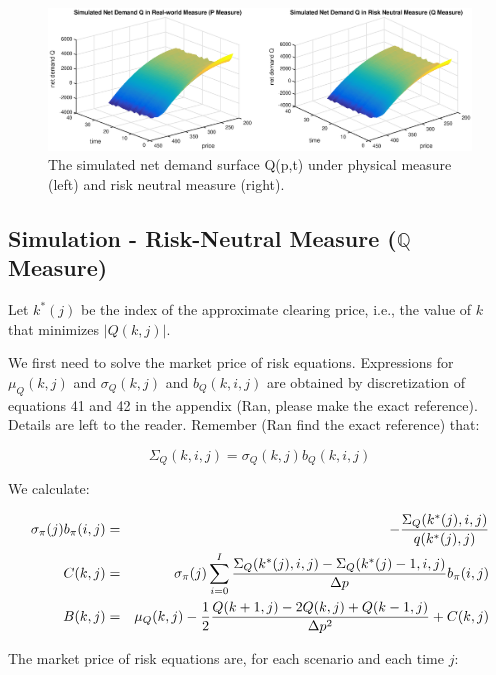 \documentclass{article}
\begin{document}
\begin{center}
\begin{figure}[tbp]
\centering
\includegraphics[scale = 0.5]{Q_both_measures.eps}\newline
\caption{The simulated net demand surface Q(p,t) under physical measure
(left) and risk neutral measure (right).}
\label{fig::AAPL_20110401_simulated_both_measures}
\end{figure}
\end{center}

\subsection{Simulation - Risk-Neutral Measure ($\mathbb{Q}$ Measure)}

Let $k^{\ast }(j)$ be the index of the approximate clearing price, i.e., the
value of $k$ that minimizes $|Q(k,j)|$.

We first need to solve the market price of risk equations. Expressions for $%
\mu _{Q}(k,j)$ and $\sigma _{Q}(k,j)$ and $b_{Q}(k,i,j)$ are obtained by
discretization of equations 41 and 42 in the appendix (Ran, please make the
exact reference). Details are left to the reader. Remember (Ran find the
exact reference) that:

\[
\Sigma _{Q}(k,i,j)=\sigma _{Q}(k,j)b_{Q}(k,i,j)
\]

We calculate:

\begin{eqnarray*}
\sigma _{\pi }(j)b_{\pi }(i,j) &=&-\frac{\Sigma _{Q}(k^{\ast }(j),i,j)}{%
q(k^{\ast }(j),j)} \\
C(k,j) &=&\sigma _{\pi }(j)\sum_{i=0}^{I}\frac{\Sigma _{Q}(k^{\ast
}(j),i,j)-\Sigma _{Q}(k^{\ast }(j)-1,i,j)}{\Delta p}b_{\pi }(i,j) \\
B(k,j) &=&\mu _{Q}(k,j)-\frac{1}{2}\frac{Q(k+1,j)-2Q(k,j)+Q(k-1,j)}{\Delta
p^{2}}+C(k,j)
\end{eqnarray*}

The market price of risk equations are, for each scenario and each time $j$:
\end{document}
